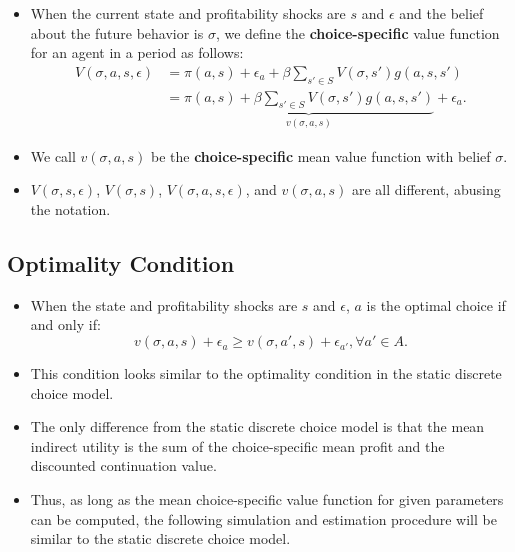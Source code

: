 \documentclass[
]{book}
\providecommand{\tightlist}{%
  \setlength{\itemsep}{0pt}\setlength{\parskip}{0pt}}
\begin{document}
\begin{itemize}
\tightlist
\item
  When the current state and profitability shocks are \(s\) and \(\epsilon\) and the belief about the future behavior is \(\sigma\), we define the \textbf{choice-specific} value function for an agent in a period as follows:
  \begin{equation}
  \begin{split}
  V(\sigma, a, s, \epsilon) &= \pi(a , s) + \epsilon_a + \beta \sum_{s' \in S} V(\sigma, s') g(a, s, s')\\
   &= \underbrace{\pi(a , s) + \beta \sum_{s' \in S} V(\sigma, s') g(a, s, s')}_{v(\sigma, a, s)} + \epsilon_a.
  \end{split}
  \end{equation}
\item
  We call \(v(\sigma, a, s)\) be the \textbf{choice-specific} mean value function with belief \(\sigma\).
\item
  \(V(\sigma, s, \epsilon)\), \(V(\sigma, s)\), \(V(\sigma, a, s, \epsilon)\), and \(v(\sigma, a, s)\) are all different, abusing the notation.
\end{itemize}

\hypertarget{optimality-condition}{%
\subsection{Optimality Condition}\label{optimality-condition}}

\begin{itemize}
\tightlist
\item
  When the state and profitability shocks are \(s\) and \(\epsilon\), \(a\) is the optimal choice if and only if:
  \begin{equation}
  v(\sigma, a, s) + \epsilon_{a} \ge v(\sigma, a', s) + \epsilon_{a'}, \forall a' \in A.
  \end{equation}
\item
  This condition looks similar to the optimality condition in the static discrete choice model.
\item
  The only difference from the static discrete choice model is that the mean indirect utility is the sum of the choice-specific mean profit and the discounted continuation value.
\item
  Thus, as long as the mean choice-specific value function for given parameters can be computed, the following simulation and estimation procedure will be similar to the static discrete choice model.
\end{itemize}
\end{document}
